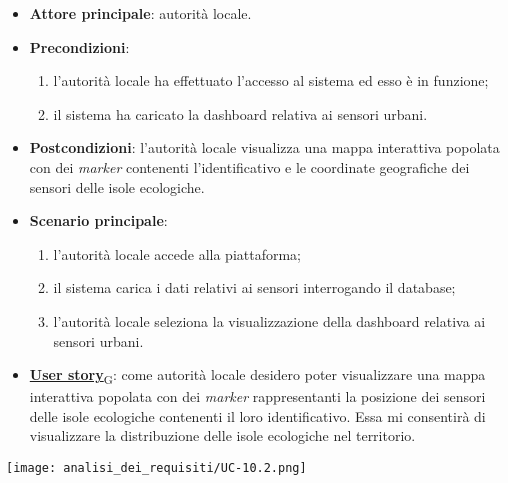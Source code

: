 \begin{itemize}
	\item \textbf{Attore principale}: autorità locale.
	\item \textbf{Precondizioni}:
	      \begin{enumerate}
		      \item l'autorità locale ha effettuato l'accesso al sistema ed esso è in funzione;
		      \item il sistema ha caricato la dashboard relativa ai sensori urbani.
	      \end{enumerate}
	\item \textbf{Postcondizioni}: l'autorità locale visualizza una mappa interattiva popolata con dei \textit{marker} contenenti l'identificativo e le coordinate geografiche dei sensori delle isole ecologiche.
	\item \textbf{Scenario principale}:
	      \begin{enumerate}
		      \item l'autorità locale accede alla piattaforma;
		      \item il sistema carica i dati relativi ai sensori interrogando il database;
		      \item l'autorità locale seleziona la visualizzazione della dashboard relativa ai sensori urbani.
	      \end{enumerate}
	\item \href{https://7last.github.io/docs/rtb/documentazione-interna/glossario\#user-story}{\textbf{User story}\textsubscript{G}}:
	      come autorità locale desidero poter visualizzare una mappa interattiva popolata con dei \textit{marker} rappresentanti la posizione dei sensori delle isole ecologiche
	      contenenti il loro identificativo. Essa mi consentirà di visualizzare la distribuzione delle isole ecologiche nel territorio.
\end{itemize}
\begin{center}
	\texttt{[image: analisi\_dei\_requisiti/UC-10.2.png]}
\end{center}



